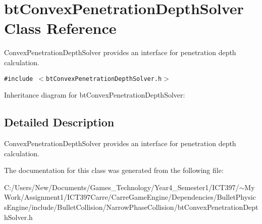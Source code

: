 \hypertarget{classbt_convex_penetration_depth_solver}{
\section{btConvexPenetrationDepthSolver Class Reference}
\label{classbt_convex_penetration_depth_solver}
}
ConvexPenetrationDepthSolver provides an interface for penetration depth calculation.  


{\tt \#include $<$btConvexPenetrationDepthSolver.h$>$}

Inheritance diagram for btConvexPenetrationDepthSolver:

\subsection{Detailed Description}
ConvexPenetrationDepthSolver provides an interface for penetration depth calculation. 

The documentation for this class was generated from the following file:\begin{CompactItemize}
\item 
C:/Users/New/Documents/Games\_\-Technology/Year4\_\-Semester1/ICT397/$\sim$My Work/Assignment1/ICT397Carre/CarreGameEngine/Dependencies/BulletPhysicsEngine/include/BulletCollision/NarrowPhaseCollision/btConvexPenetrationDepthSolver.h\end{CompactItemize}
